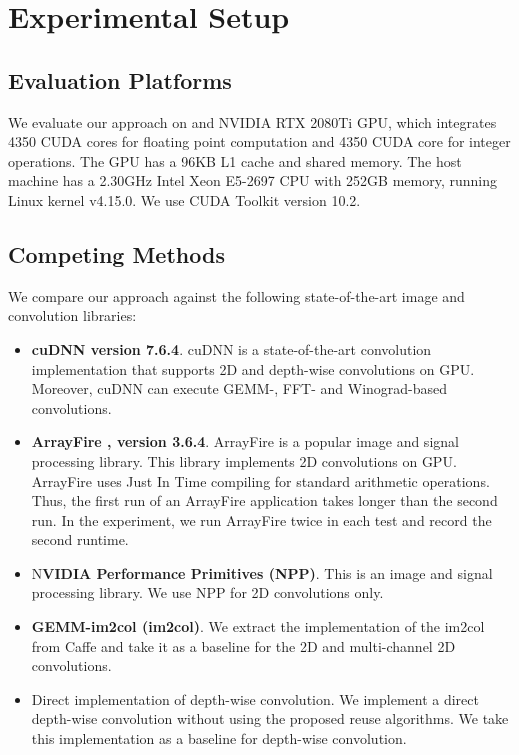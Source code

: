 

\section{Experimental Setup}

\subsection{Evaluation Platforms} We evaluate our approach on and NVIDIA RTX 2080Ti GPU, which integrates 4350 CUDA cores for floating
point computation  and 4350 CUDA core for integer operations. The GPU has a 96KB L1 cache and shared memory. The host machine has a 2.30GHz
Intel Xeon E5-2697 CPU with 252GB memory, running Linux kernel v4.15.0. We use CUDA Toolkit version 10.2.


\subsection{Competing Methods} We compare our approach against the following state-of-the-art image and convolution libraries:
\begin{itemize}
  \item \textbf{cuDNN version 7.6.4}. cuDNN is a state-of-the-art convolution implementation that supports 2D and depth-wise convolutions
      on GPU. Moreover, cuDNN can execute GEMM-, FFT- and Winograd-based convolutions.
  \item \textbf{ArrayFire \cite{Yalamanchili2015}, version 3.6.4}. ArrayFire is a popular image and signal processing library. This
      library implements 2D convolutions on GPU. ArrayFire uses Just In Time compiling for standard arithmetic operations. Thus, the
      first run of an ArrayFire application takes longer than the second run. In the experiment, we run ArrayFire twice in each test and
      record the second runtime.
  \item N\textbf{VIDIA Performance Primitives (NPP)}. This is an image and signal processing library. We use NPP for 2D convolutions
      only.
  \item \textbf{GEMM-im2col (im2col)}. We extract the implementation of the im2col from Caffe \cite{jia2014caffe} and take it as a
      baseline for the 2D and multi-channel 2D convolutions.
  \item Direct implementation of depth-wise convolution. We implement a direct depth-wise convolution without using the proposed reuse algorithms. We take this implementation as a baseline for depth-wise convolution.

\end{itemize}

